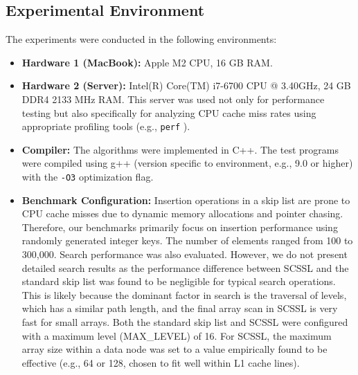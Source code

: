 \documentclass[sigconf, nonacm, letterpaper,top=2cm,bottom=2cm,left=3cm,right=3cm,marginparwidth=1.75cm]{acmart}
\begin{document}
\subsection{Experimental Environment}

The experiments were conducted in the following environments:
\begin{itemize}
    \item \textbf{Hardware 1 (MacBook):} Apple M2 CPU, 16 GB RAM.
    \item \textbf{Hardware 2 (Server):} Intel(R) Core(TM) i7-6700 CPU @ 3.40GHz, 24 GB DDR4 2133 MHz RAM. This server was used not only for performance testing but also specifically for analyzing CPU cache miss rates using appropriate profiling tools (e.g.,  \texttt{perf} ).
    \item \textbf{Compiler:} The algorithms were implemented in C++. The test programs were compiled using g++ (version specific to environment, e.g., 9.0 or higher) with the \texttt{-O3} optimization flag.
    \item \textbf{Benchmark Configuration:}
        Insertion operations in a skip list are prone to CPU cache misses due to dynamic memory allocations and pointer chasing. Therefore, our benchmarks primarily focus on insertion performance using randomly generated integer keys. The number of elements ranged from 100 to 300,000.
        Search performance was also evaluated. However, we do not present detailed search results as the performance difference between SCSSL and the standard skip list was found to be negligible for typical search operations. This is likely because the dominant factor in search is the traversal of levels, which has a similar path length, and the final array scan in SCSSL is very fast for small arrays.
        Both the standard skip list and SCSSL were configured with a maximum level (MAX\_LEVEL) of 16. For SCSSL, the maximum array size within a data node was set to a value empirically found to be effective (e.g., 64 or 128, chosen to fit well within L1 cache lines).
\end{itemize}
\end{document}
